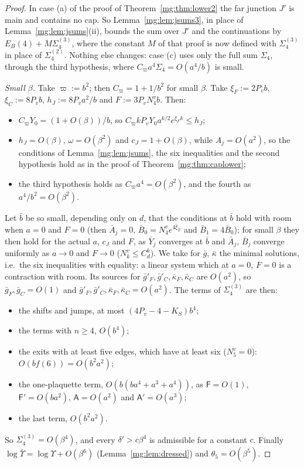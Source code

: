 \documentclass[11pt,a4paper]{article}
\theoremstyle{definition}
\theoremstyle{remark}
\begin{document}
\begin{proof}
In case (a) of the proof of Theorem~\ref{mg:thm:lower2} the far junction $J'$ is main and contains no cap. So Lemma~\ref{mg:lem:jsums3}, in place of
Lemma~\ref{mg:lem:jsums}(ii), bounds the sum over $J'$ and the continuations by $E_B(4)+M\Sigma^{(3)}_4$, where the constant $M$ of that proof is now
defined with $\Sigma^{(3)}_4$ in place of $\Sigma^{(2)}_4$. Nothing else changes: case (c) uses only the full sum $\Sigma_4$, through the third hypothesis,
where $C_\varpi a^4\Sigma_4=O(a^4/b)$ is small.

\emph{Small $\beta$.} Take $\varpi:=b^2$; then $C_\varpi=1+1/b^2$ for small $\beta$. Take $\xi_F:=2P_vb$, $\xi_C:=8P_vb$, $h_J:=8P_va^2/b$ and
$F:=3P_vN^v_4b$. Then:
\begin{itemize}
\item $C_\varpi Y_0=(1+O(\beta))/b$, so $C_\varpi kP_vY_0a^{k/2}e^{\xi_Fk}\le h_J$;
\item $h_J=O(\beta)$, $\omega=O(\beta^2)$ and $c_J=1+O(\beta)$, while $A_j=O(a^2)$, so the conditions of Lemma~\ref{mg:lem:jsums}, the six inequalities and the
second hypothesis hold as in the proof of Theorem~\ref{mg:thm:caplower};
\item the third hypothesis holds as $C_\varpi a^4=O(\beta^2)$, and the fourth as $a^4/b^2=O(\beta^2)$.
\end{itemize}
Let $\bar b$ be so small, depending only on $d$, that the conditions at $\bar b$ hold with room when $a=0$ and $F=0$ (then $\bar A_j=0$,
$\bar B_0=N^v_4e^{4\bar\xi_F}$ and $\bar B_1=4\bar B_0$); for small $\beta$ they then hold for the actual $a$, $c_J$ and $F$, as $\bar Y_j$ converges at
$\bar b$ and $\bar A_j$, $\bar B_j$ converge uniformly as $a\to0$ and $F\to0$ ($N^v_k\le C_d^k$). We take for $\bar g$, $\bar\kappa$ the minimal solutions, i.e.\ the six
inequalities with equality: a linear system which at $a=0$, $F=0$ is a contraction with room. Its sources for $\bar g'_F,\bar g'_C,\bar\kappa_F,\bar\kappa_C$ are
$O(a^2)$, so $\bar g_F,\bar g_C=O(1)$ and $\bar g'_F,\bar g'_C,\bar\kappa_F,\bar\kappa_C=O(a^2)$. The terms of $\Sigma^{(3)}_4$ are then:
\begin{itemize}
\item the shifts and jumps, at most $(4P_v-4-K_S)b^4$;
\item the terms with $n\ge4$, $O(b^4)$;
\item the exits with at least five edges, which have at least six ($N^v_5=0$): $O(bf(6))=O(b^2a^2)$;
\item the one-plaquette term, $O(b(ba^4+a^3+a^4))$, as $\mathsf F=O(1)$, $\mathsf F'=O(ba^2)$, $\mathsf A=O(a^2)$ and $\mathsf A'=O(a^3)$;
\item the last term, $O(b^2a^2)$.
\end{itemize}
So $\Sigma^{(3)}_4=O(\beta^4)$, and every $\delta'>c\beta^4$ is admissible for a constant $c$. Finally $\log\bar\Upsilon=\log\Upsilon+O(\beta^6)$
(Lemma~\ref{mg:lem:dressed}) and $\theta_5=O(\beta^5)$.
\end{proof}
\end{document}
